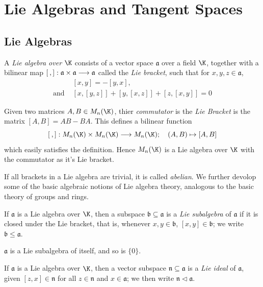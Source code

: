 \chapter{Lie Algebras and Tangent Spaces}

\section{Lie Algebras}

\begin{definition}
  A {\it Lie algebra over \(\K\)} consists of a vector space \(\mathfrak{a}\) over a field
  \(\K\), together with a bilinear map \([\hspace{2px},]:\mathfrak{a}\times\mathfrak{a}\longrightarrow\mathfrak{a}\)
  called the {\it Lie bracket}, such that for \(x,y,z\in\mathfrak{a}\),
  \begin{eqnarray*}
    &[x,y]=-[y,x], \\
    \text{and } &[x,[y,z]]+[y,[x,z]]+[z,[x,y]]=0
  \end{eqnarray*}
\end{definition}

Given two matrices \(A,B\in M_n(\K)\), thier {\it commutator} is the {\it Lie Bracket}
is the matrix \([A,B]=AB-BA\). This defines a bilinear function
\[ [\hspace{2px},]:M_n(\K)\times M_n(\K)\longrightarrow M_n(\K);\hspace{10px} (A,B)\mapsto [A,B] \]
which easily satisfies the definition. Hence \(M_n(\K)\) is a Lie algebra over \(\K\) with
the commutator as it's Lie bracket.

If all brackets in a Lie algebra are trivial, it is called {\it abelian}.
We further devolop some of the basic algebraic notions of Lie algebra theory, analogous
to the basic theory of groups and rings.

\begin{definition}
  If \(\mathfrak{a}\) is a Lie algebra over \(\K\), then a subspace \(\mathfrak{b}\subseteq\mathfrak{a}\)
  is a {\it Lie subalgebra} of \(\mathfrak{a}\) if it is closed under the Lie bracket, that is,
  whenever \(x,y\in\mathfrak{b}\), \([x,y]\in\mathfrak{b}\); we write \(\mathfrak{b}\le\mathfrak{a}\).
\end{definition}

\(\mathfrak{a}\) is a Lie subalgebra of itself, and so is \(\{0\}\).

\begin{definition}
  If \(\mathfrak{a}\) is a Lie algebra over \(\K\), then a vector subspace \(\mathfrak{n}\subseteq\mathfrak{a}\)
  is a {\it Lie ideal} of \(\mathfrak{a}\), given \([z,x]\in\mathfrak{n}\) for all
  \(z\in\mathfrak{n}\) and \(x\in\mathfrak{a}\); we then write \(\mathfrak{n}\vartriangleleft\mathfrak{a}\).
\end{definition}

